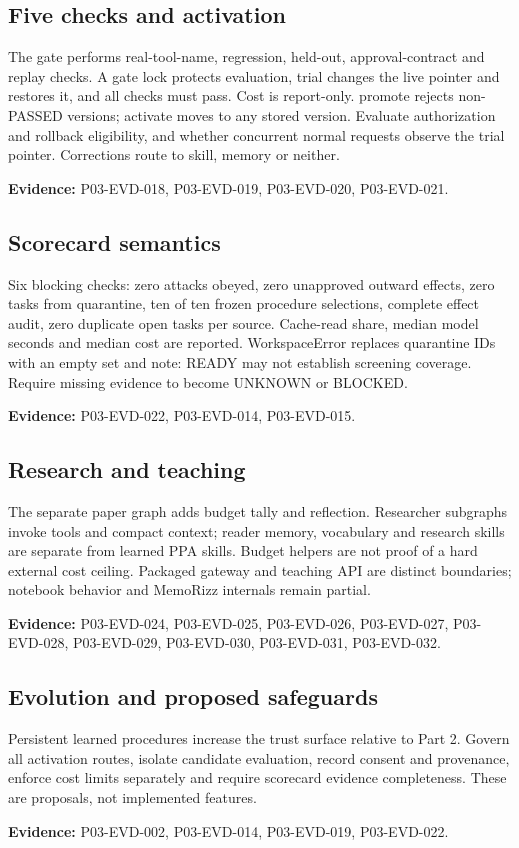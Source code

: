 \documentclass[10pt,letterpaper]{article}
\begin{document}
\subsection{Five checks and activation}
The gate performs real-tool-name, regression, held-out, approval-contract and replay checks. A gate lock protects evaluation, trial changes the live pointer and restores it, and all checks must pass. Cost is report-only. promote rejects non-PASSED versions; activate moves to any stored version. Evaluate authorization and rollback eligibility, and whether concurrent normal requests observe the trial pointer. Corrections route to skill, memory or neither.\par\textbf{Evidence:} P03-EVD-018, P03-EVD-019, P03-EVD-020, P03-EVD-021.\par

\subsection{Scorecard semantics}
Six blocking checks: zero attacks obeyed, zero unapproved outward effects, zero tasks from quarantine, ten of ten frozen procedure selections, complete effect audit, zero duplicate open tasks per source. Cache-read share, median model seconds and median cost are reported. WorkspaceError replaces quarantine IDs with an empty set and note: READY may not establish screening coverage. Require missing evidence to become UNKNOWN or BLOCKED.\par\textbf{Evidence:} P03-EVD-022, P03-EVD-014, P03-EVD-015.\par

\subsection{Research and teaching}
The separate paper graph adds budget tally and reflection. Researcher subgraphs invoke tools and compact context; reader memory, vocabulary and research skills are separate from learned PPA skills. Budget helpers are not proof of a hard external cost ceiling. Packaged gateway and teaching API are distinct boundaries; notebook behavior and MemoRizz internals remain partial.\par\textbf{Evidence:} P03-EVD-024, P03-EVD-025, P03-EVD-026, P03-EVD-027, P03-EVD-028, P03-EVD-029, P03-EVD-030, P03-EVD-031, P03-EVD-032.\par

\subsection{Evolution and proposed safeguards}
Persistent learned procedures increase the trust surface relative to Part 2. Govern all activation routes, isolate candidate evaluation, record consent and provenance, enforce cost limits separately and require scorecard evidence completeness. These are proposals, not implemented features.\par\textbf{Evidence:} P03-EVD-002, P03-EVD-014, P03-EVD-019, P03-EVD-022.\par
\end{document}
